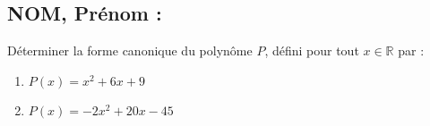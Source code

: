 \documentclass[a4paper,11pt,exos]{nsi} %
\begin{document}
\subsection*{NOM, Prénom : \dotfill} 


\maketitle




\begin{exercice}
Déterminer la forme canonique du polynôme $P$, défini pour tout $x \in \mathbb{R}$ par : 
\begin{multicols}{2}
    \begin{enumerate}
        \item $P(x)=x^2+6x+9$
        \item $P(x)=-2x^2+20x-45$
    \end{enumerate}
\end{multicols}
\end{exercice}

\end{document}
